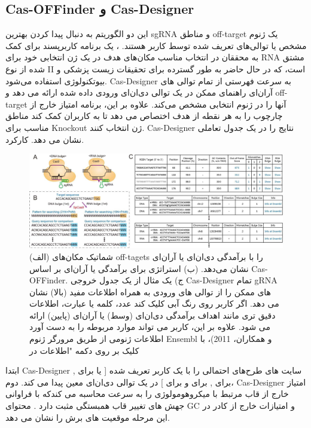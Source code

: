 \documentclass[12pt,a4paper,BCOR=.7cm,headsepline,bibliography=totoc]{report}
\begin{document}
\subsection{Cas-OFFinder و Cas-Designer ~\cite{Cas-OFFinder, Cas-Designer}}
این دو الگوریتم به دنبال پیدا کردن بهترین sgRNA و مناطق off-target یک ژنوم مشخص یا توالی‌های تعریف شده توسط کاربر هستند.
،
 یک برنامه کاربرپسند برای کمک به محققان در انتخاب مناسب مکان‌های هدف در یک ژن انتخابی خود برای RNA مشتق شده از نوع II است، که در حال حاضر به طور گسترده برای تحقیقات زیست پزشکی و بیوتکنولوژی استفاده می‌شود. Cas-Designer به سرعت فهرستی از تمام توالی های آر‌ان‌ای راهنمای ممکن در یک توالی دی‌ان‌ای ورودی داده شده ارائه می دهد
 و off-target آنها را در ژنوم انتخابی مشخص می‌کند. علاوه بر این، برنامه امتیاز خارج از چارچوب را به هر نقطه از هدف اختصاص می دهد تا به کاربران کمک کند مناطق مناسب برای Knockout ژن انتخاب کنند.
 Cas-Designer نتایج را در یک جدول تعاملی نشان می دهد.
کارکرد.

\begin{figure}[!h]
\centering
\includegraphics[width=16cm, ]{pictures/Cas-Designer.jpg}
\caption{
(الف) شماتیک مکان‌های off-tagets را با برآمدگی دی‌ان‌ای یا آر‌ان‌ای نشان می‌دهد. (ب) استراتژی برای  برآمدگی  یا آر‌ان‌ای بر اساس Cas-OFFinder. ج) یک مثال
از یک جدول خروجی Cas-Designer تمام gRNA های ممکن را از توالی های ورودی به همراه اطلاعات مفید (بالا) نشان می دهد. اگر کاربر روی رنگ آبی کلیک کند
عدد، کلمه یا عبارت، اطلاعات دقیق تری مانند اهداف برآمدگی دی‌ان‌ای (وسط) یا آر‌ان‌ای (پایین) ارائه می شود. علاوه بر این، کاربر می تواند موارد مربوطه را به دست آورد
اطلاعات ژنومی از طریق مرورگر ژنوم Ensembl  و همکاران، 2011)، با کلیک بر روی دکمه "اطلاعات در  \cite{Cas-OFFinder}
}\label{fig:4}
\end{figure}

ابتدا Cas-Designer سایت های طرح‌های احتمالی را با یک کاربر تعریف شده [ یا  برای ,  برای ,  برای  و  برای ] در یک توالی دی‌ان‌ای معین  پیدا می کند. دوم، Cas-Designer
امتیاز خارج از قاب مرتبط با میکروهومولوژی را به سرعت محاسبه می کندکه با فراوانی جهش های تغییر قاب همبستگی مثبت دارد . محتوای GC و امتیازات خارج از کادر در این مرحله موقعیت های برش را نشان می دهد.
\end{document}
